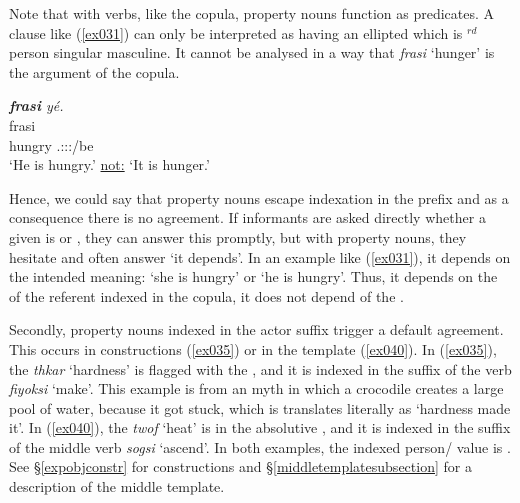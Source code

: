 Note that with  verbs, like the copula, property nouns function as  predicates. A clause like (\ref{ex031}) can only be interpreted as having an ellipted  which is \Third{}$^{rd}$ person singular masculine. It cannot be analysed in a way that \emph{frasi} `hunger' is the argument of the copula.

\begin{exe}
	\ex \emph{\textbf{frasi} yé.}\\
	\gll frasi \\
	hungry \Tsg{}.\Masc:\Sbj:\Nonpast:\Ipfv/be\\
	\trans `He is hungry.' \underline{not:} `It is hunger.'
	\label{ex031}
\end{exe}

Hence, we could say that property nouns escape indexation in the  prefix and as a consequence there is no  agreement. If informants are asked directly whether a given  is  or , they can answer this promptly, but with property nouns, they hesitate and often answer `it depends'. In an example like (\ref{ex031}), it depends on the intended meaning: `she is hungry' or `he is hungry'. Thus, it depends on the  of the referent indexed in the copula, it does not depend of the .%

Secondly, property nouns indexed in the actor suffix trigger a default   agreement. This occurs in  constructions (\ref{ex035}) or in the  template (\ref{ex040}). In (\ref{ex035}), the  \emph{thkar} `hardness' is flagged with the  , and it is indexed in the suffix of the verb \emph{fiyoksi} `make'. This example is from an myth in which a crocodile creates a large pool of water, because it got stuck, which is translates literally as `hardness made it'. In (\ref{ex040}), the  \emph{twof} `heat' is in the absolutive , and it is indexed in the suffix of the middle verb \emph{sogsi} `ascend'. In both examples, the indexed person/ value is \Stsg. See \S{}\ref{expobjconstr} for  constructions and \S{}\ref{middletemplatesubsection} for a description of the middle template.

